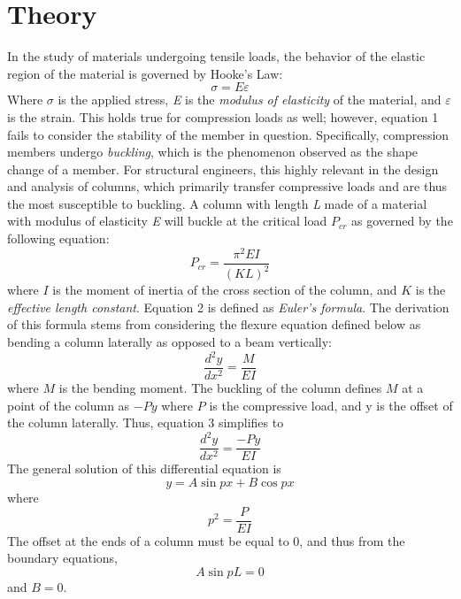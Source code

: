 \documentclass{article}
\begin{document}
    
    \newpage
    \section{Theory}
    \noindent In the study of materials undergoing tensile loads, the behavior of the elastic region of the material is governed by Hooke's Law: 
    \begin{equation}
        \sigma = E \varepsilon 
    \end{equation}
    Where $\sigma$ is the applied stress, \emph{E} is the \emph{modulus of elasticity} of the material, and $\varepsilon$ is the strain. This holds true for compression loads as well; however, equation 1 fails to consider the stability of the member in question. Specifically, compression members undergo \emph{buckling}, which is the phenomenon observed as the shape change of a member. For structural engineers, this highly relevant in the design and analysis of columns, which primarily transfer compressive loads and are thus the most susceptible to buckling. A column with length \emph{L} made of a material with modulus of elasticity \emph{E} will buckle at the critical load $P_{cr}$ as governed by the following equation: 
    \begin{equation}
        P_{cr} = \frac{\pi^2 E I}{(KL)^2} 
    \end{equation}
    where $I$ is the moment of inertia of the cross section of the column, and $K$ is the \emph{effective length constant}. Equation 2 is defined as \emph{Euler's formula}. The derivation of this formula stems from considering the flexure equation defined below as bending a column laterally as opposed to a beam vertically:
    \begin{equation}
    \frac{d^2y}{dx^2} = \frac{M}{EI}
    \end{equation}
    where $M$ is the bending moment. The buckling of the column defines $M$ at a point of the column as $-Py$ where $P$ is the compressive load, and y is the offset of the column laterally. Thus, equation 3 simplifies to \[
        \frac{d^2y}{dx^2} = \frac{-Py}{EI}
    \]
    The general solution of this differential equation is 
    \[ y = A \sin px + B \cos px\]
    where \[ p^2 = \frac{P}{EI}\]
    \newpage
    \noindent The offset at the ends of a column must be equal to 0, and thus from the boundary equations,
    \[ A \sin pL = 0\]
    and $B = 0$.
    \\
\end{document}
